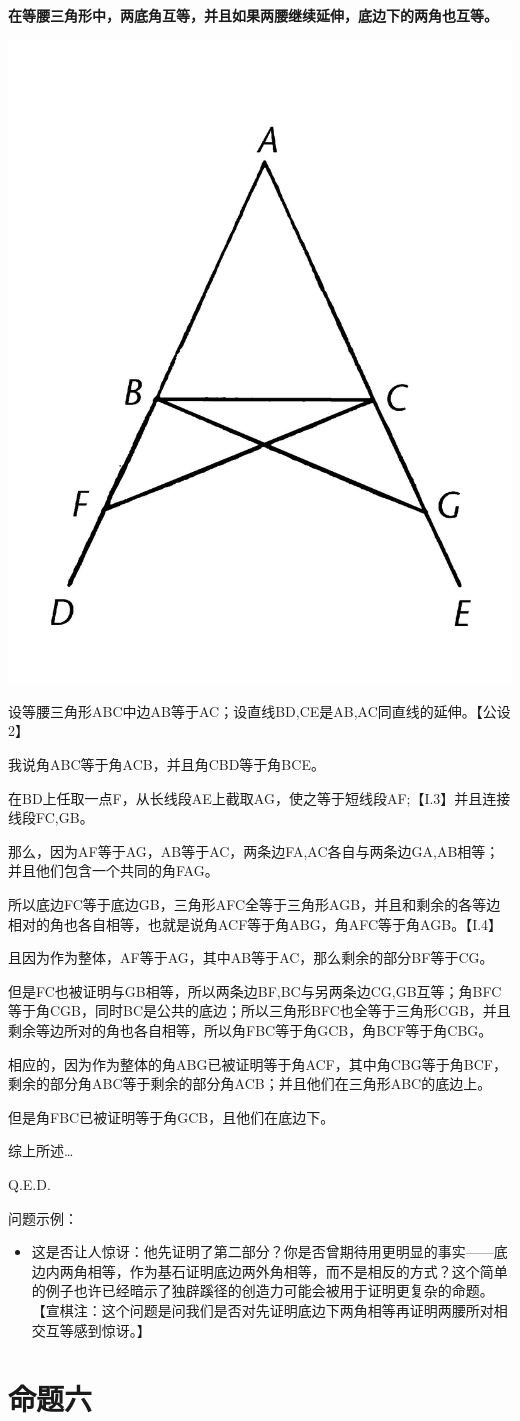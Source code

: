 \documentclass[
]{book}
\providecommand{\tightlist}{%
  \setlength{\itemsep}{0pt}\setlength{\parskip}{0pt}}
\begin{document}
\textbf{在等腰三角形中，两底角互等，并且如果两腰继续延伸，底边下的两角也互等。}

\includegraphics[width=0.25\linewidth]{./image/img455}

设等腰三角形ABC中边AB等于AC；设直线BD,CE是AB,AC同直线的延伸。【公设2】

我说角ABC等于角ACB，并且角CBD等于角BCE。

在BD上任取一点F，从长线段AE上截取AG，使之等于短线段AF;【I.3】并且连接线段FC,GB。

那么，因为AF等于AG，AB等于AC，两条边FA,AC各自与两条边GA,AB相等；并且他们包含一个共同的角FAG。

所以底边FC等于底边GB，三角形AFC全等于三角形AGB，并且和剩余的各等边相对的角也各自相等，也就是说角ACF等于角ABG，角AFC等于角AGB。【I.4】

且因为作为整体，AF等于AG，其中AB等于AC，那么剩余的部分BF等于CG。

但是FC也被证明与GB相等，所以两条边BF,BC与另两条边CG,GB互等；角BFC等于角CGB，同时BC是公共的底边；所以三角形BFC也全等于三角形CGB，并且剩余等边所对的角也各自相等，所以角FBC等于角GCB，角BCF等于角CBG。

相应的，因为作为整体的角ABG已被证明等于角ACF，其中角CBG等于角BCF，剩余的部分角ABC等于剩余的部分角ACB；并且他们在三角形ABC的底边上。

但是角FBC已被证明等于角GCB，且他们在底边下。

综上所述\ldots{}

Q.E.D.

问题示例：

\begin{itemize}
\tightlist
\item
  这是否让人惊讶：他先证明了第二部分？你是否曾期待用更明显的事实------底边内两角相等，作为基石证明底边两外角相等，而不是相反的方式？这个简单的例子也许已经暗示了独辟蹊径的创造力可能会被用于证明更复杂的命题。
  【宣棋注：这个问题是问我们是否对先证明底边下两角相等再证明两腰所对相交互等感到惊讶。】
\end{itemize}

\hypertarget{ux547dux9898ux516d}{%
\section{命题六}\label{ux547dux9898ux516d}}
\end{document}
